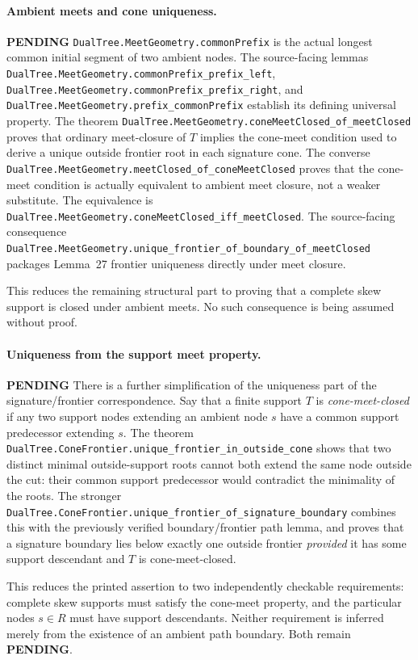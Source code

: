\documentclass[11pt]{article}
\newcommand{\todo}{\textcolor{gray!70!black}{\textbf{PENDING}}}
\newcommand{\lean}[1]{\texttt{#1}}
\begin{document}
\paragraph{Ambient meets and cone uniqueness.} \todo
\lean{DualTree.MeetGeometry.commonPrefix} is the actual longest common
initial segment of two ambient nodes.  The source-facing lemmas
\lean{DualTree.MeetGeometry.commonPrefix_prefix_left},
\lean{DualTree.MeetGeometry.commonPrefix_prefix_right}, and
\lean{DualTree.MeetGeometry.prefix_commonPrefix} establish its defining
universal property.
The theorem
\lean{DualTree.MeetGeometry.coneMeetClosed_of_meetClosed} proves that
ordinary meet-closure of $T$ implies the cone-meet condition used
to derive a unique outside frontier root in each signature cone.
The converse
\lean{DualTree.MeetGeometry.meetClosed_of_coneMeetClosed}
proves that the cone-meet condition is actually equivalent to ambient
meet closure, not a weaker substitute.  The equivalence is
\lean{DualTree.MeetGeometry.coneMeetClosed_iff_meetClosed}.
The source-facing consequence
\lean{DualTree.MeetGeometry.unique_frontier_of_boundary_of_meetClosed}
packages Lemma~27 frontier uniqueness directly under meet closure.

This reduces the remaining structural part to proving that a complete
skew support is closed under ambient meets.  No such consequence is
being assumed without proof.

\paragraph{Uniqueness from the support meet property.} \todo
There is a further simplification of the uniqueness part of the
signature/frontier correspondence.  Say that a finite support $T$ is
\emph{cone-meet-closed} if any two support nodes extending an ambient
node $s$ have a common support predecessor extending $s$.
The theorem
\lean{DualTree.ConeFrontier.unique_frontier_in_outside_cone}
shows that two distinct minimal outside-support roots cannot both extend
the same node outside the cut: their common support predecessor would
contradict the minimality of the roots.
The stronger
\lean{DualTree.ConeFrontier.unique_frontier_of_signature_boundary}
combines this with the previously verified boundary/frontier path lemma,
and proves that a signature boundary lies below exactly one outside
frontier \emph{provided} it has some support descendant and $T$ is
cone-meet-closed.

This reduces the printed assertion to two independently checkable
requirements: complete skew supports must satisfy the cone-meet property,
and the particular nodes $s\in R$ must have support descendants.
Neither requirement is inferred merely from the existence of an ambient
path boundary.  Both remain \todo.
\end{document}
